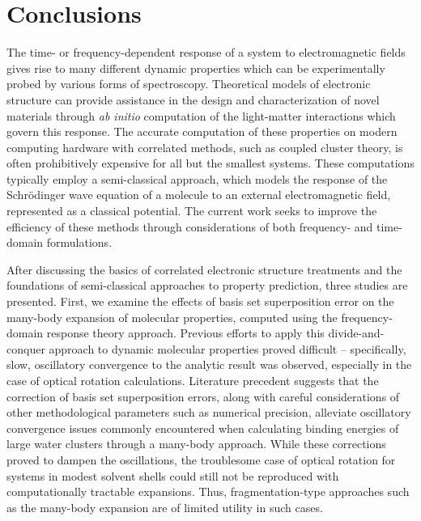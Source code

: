 \chapter{Conclusions} \label{ch:conc} The time- or frequency-dependent
response of a system to electromagnetic fields gives rise to many different
dynamic properties which can be experimentally probed by various forms
of spectroscopy. Theoretical models of electronic structure can provide
assistance in the design and characterization of novel materials through
\textit{ab initio} computation of the light-matter interactions which
govern this response. The accurate computation of these properties on
modern computing hardware with correlated methods, such as coupled cluster
theory, is often prohibitively expensive for all but the smallest systems.
These computations typically employ a semi-classical approach, which
models the response of the Schr\"odinger wave equation of a molecule to
an external electromagnetic field, represented as a classical potential.
The current work seeks to improve the efficiency of these methods through
considerations of both frequency- and time-domain formulations.

After discussing the basics of correlated electronic structure treatments
and the foundations of semi-classical approaches to property prediction,
three studies are presented. First, we examine the effects of basis set
superposition error on the many-body expansion of molecular properties,
computed using the frequency-domain response theory approach. Previous
efforts to apply this divide-and-conquer approach to dynamic molecular
properties proved difficult -- specifically, slow, oscillatory convergence
to the analytic result was observed, especially in the case of optical
rotation calculations. Literature precedent suggests that the correction of
basis set superposition errors, along with careful considerations of other
methodological parameters such as numerical precision, alleviate oscillatory
convergence issues commonly encountered when calculating binding energies of
large water clusters through a many-body approach. While these corrections
proved to dampen the oscillations, the troublesome case of optical rotation
for systems in modest solvent shells could still not be reproduced with
computationally tractable expansions. Thus, fragmentation-type approaches
such as the many-body expansion are of limited utility in such cases.

